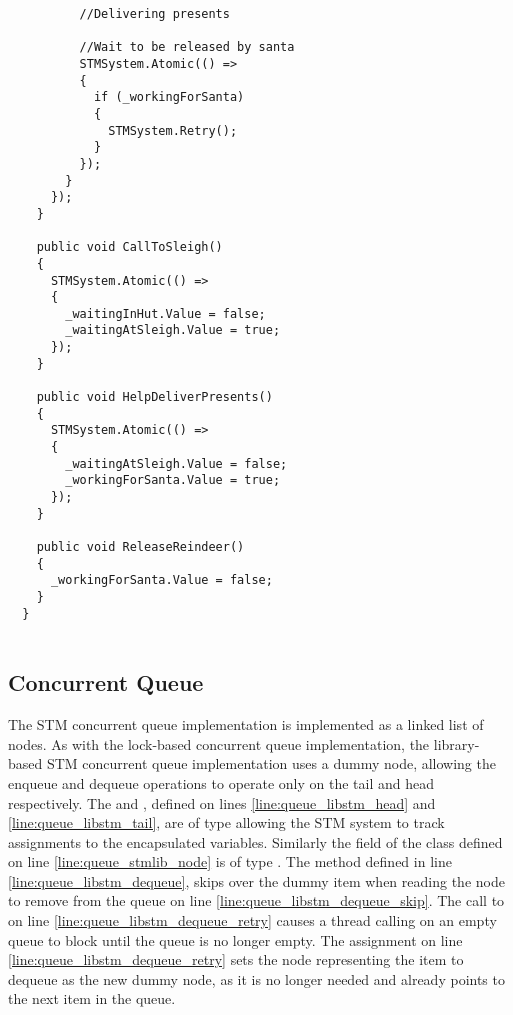 \begin{lstlisting}
          //Delivering presents

          //Wait to be released by santa
          STMSystem.Atomic(() =>
          {
            if (_workingForSanta)
            {
              STMSystem.Retry();
            }
          });   
        }
      });
    }

    public void CallToSleigh()
    {
      STMSystem.Atomic(() =>
      {
        _waitingInHut.Value = false;
        _waitingAtSleigh.Value = true;
      });
    }

    public void HelpDeliverPresents()
    {
      STMSystem.Atomic(() =>
      {
        _waitingAtSleigh.Value = false;
        _workingForSanta.Value = true;
      });
    }

    public void ReleaseReindeer()
    {
      _workingForSanta.Value = false;
    }
  }
  
\end{lstlisting}
\subsection{Concurrent Queue}
The \ac{STM} concurrent queue implementation is implemented as a linked list of nodes. As with the lock-based concurrent queue implementation, the library-based \ac{STM} concurrent queue implementation uses a dummy node, allowing the enqueue and dequeue operations to operate only on the tail and head respectively. The  and , defined on lines \ref{line:queue_libstm_head} and \ref{line:queue_libstm_tail}, are of type  allowing the \ac{STM} system to track assignments to the encapsulated variables. Similarly the  field of the  class defined on line \ref{line:queue_stmlib_node} is of type . The  method defined in line \ref{line:queue_libstm_dequeue}, skips over the dummy item when reading the node to remove from the queue on line \ref{line:queue_libstm_dequeue_skip}. The call to  on line \ref{line:queue_libstm_dequeue_retry} causes a thread calling  on an empty queue to block until the queue is no longer empty. The assignment on line \ref{line:queue_libstm_dequeue_retry} sets the node representing the item to dequeue as the new dummy node, as it is no longer needed and already points to the next item in the queue. 

